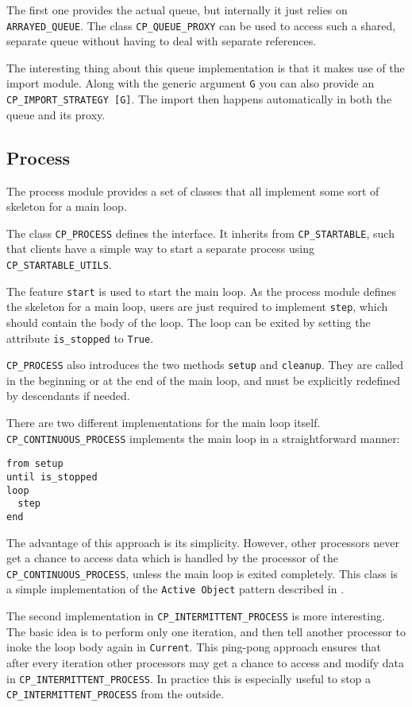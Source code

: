 \documentclass[a4paper,10pt]{report}
\begin{document}
The first one provides the actual queue, but internally it just relies on \lstinline!ARRAYED_QUEUE!.
The class \lstinline!CP_QUEUE_PROXY! can be used to access such a shared, separate queue without having to deal with separate references.

The interesting thing about this queue implementation is that it makes use of the import module.
Along with the generic argument \lstinline!G! you can also provide an \lstinline!CP_IMPORT_STRATEGY [G]!.
The import then happens automatically in both the queue and its proxy.

\subsection{Process}

The process module provides a set of classes that all implement some sort of skeleton for a main loop.

The class \lstinline!CP_PROCESS! defines the interface.
It inherits from \lstinline!CP_STARTABLE!, such that clients have a simple way to start a separate process using \lstinline!CP_STARTABLE_UTILS!.

The feature \lstinline!start! is used to start the main loop.
As the process module defines the skeleton for a main loop, users are just required to implement \lstinline!step!, which should contain the body of the loop.
The loop can be exited by setting the attribute \lstinline!is_stopped! to \lstinline!True!.

\lstinline!CP_PROCESS! also introduces the two methods \lstinline!setup! and \lstinline!cleanup!.
They are called in the beginning or at the end of the main loop, and must be explicitly redefined by descendants if needed.

There are two different implementations for the main loop itself.
\lstinline!CP_CONTINUOUS_PROCESS! implements the main loop in a straightforward manner:
\begin{lstlisting}
from setup
until is_stopped
loop
  step
end
\end{lstlisting}
The advantage of this approach is its simplicity.
However, other processors never get a chance to access data which is handled by the processor of the \lstinline!CP_CONTINUOUS_PROCESS!, unless the main loop is exited completely.
This class is a simple implementation of the \lstinline!Active Object! pattern described in .

The second implementation in \lstinline!CP_INTERMITTENT_PROCESS! is more interesting.
The basic idea is to perform only one iteration, and then tell another processor to inoke the loop body again in \lstinline!Current!.
This ping-pong approach ensures that after every iteration other processors may get a chance to access and modify data in \lstinline!CP_INTERMITTENT_PROCESS!.
In practice this is especially useful to stop a \lstinline!CP_INTERMITTENT_PROCESS! from the outside.
\end{document}
